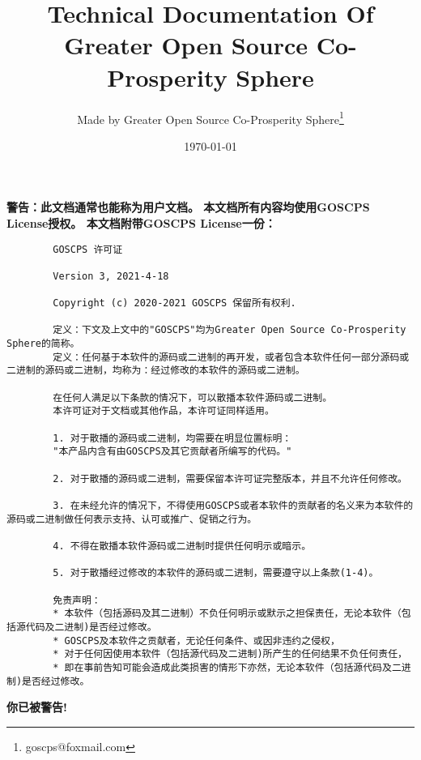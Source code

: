 \documentclass[UTF-8,twoside,a4paper,final,titlepage]{ctexbook}
\begin{document}
	\frontmatter
	
	\title{Technical Documentation Of Greater Open Source Co-Prosperity Sphere} 
	\author{Made by Greater Open Source Co-Prosperity Sphere\thanks{goscps@foxmail.com}}
	\date{\today}
	\maketitle
	
	\textbf{警告：此文档通常也能称为用户文档。
		本文档所有内容均使用GOSCPS License授权。\newline{}
		本文档附带GOSCPS License一份：}
	\begin{lstlisting}
		GOSCPS 许可证
		
		Version 3, 2021-4-18
		
		Copyright (c) 2020-2021 GOSCPS 保留所有权利.
		
		定义：下文及上文中的"GOSCPS"均为Greater Open Source Co-Prosperity Sphere的简称。
		定义：任何基于本软件的源码或二进制的再开发，或者包含本软件任何一部分源码或二进制的源码或二进制，均称为：经过修改的本软件的源码或二进制。
		
		在任何人满足以下条款的情况下，可以散播本软件源码或二进制。
		本许可证对于文档或其他作品，本许可证同样适用。
		
		1. 对于散播的源码或二进制，均需要在明显位置标明：
		"本产品内含有由GOSCPS及其它贡献者所编写的代码。"
		
		2. 对于散播的源码或二进制，需要保留本许可证完整版本，并且不允许任何修改。
		
		3. 在未经允许的情况下，不得使用GOSCPS或者本软件的贡献者的名义来为本软件的源码或二进制做任何表示支持、认可或推广、促销之行为。
		
		4. 不得在散播本软件源码或二进制时提供任何明示或暗示。
		
		5. 对于散播经过修改的本软件的源码或二进制，需要遵守以上条款(1-4)。
		
		免责声明：
		* 本软件（包括源码及其二进制）不负任何明示或默示之担保责任，无论本软件（包括源代码及二进制)是否经过修改。
		* GOSCPS及本软件之贡献者，无论任何条件、或因非违约之侵权，
		* 对于任何因使用本软件（包括源代码及二进制)所产生的任何结果不负任何责任，
		* 即在事前告知可能会造成此类损害的情形下亦然，无论本软件（包括源代码及二进制)是否经过修改。
	\end{lstlisting}
	\textbf{你已被警告!}
	
	\tableofcontents
	
	\mainmatter
	
	
	
	\backmatter
	
	
	
	\printindex
	
\end{document}
